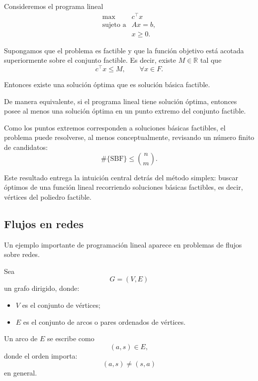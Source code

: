 \begin{theorem}
Consideremos el programa lineal
\[
    \begin{array}{ll}
        \max & c^\top x\\[1mm]
        \text{sujeto a} & Ax=b,\\
        & x\geq 0.
    \end{array}
\]

Supongamos que el problema es factible y que la función objetivo está acotada superiormente sobre el conjunto factible. Es decir, existe \(M\in\mathbb{R}\) tal que
\[
    c^\top x\leq M,
    \qquad
    \forall x\in F.
\]

Entonces existe una solución óptima que es solución básica factible.
\end{theorem}

De manera equivalente, si el programa lineal tiene solución óptima, entonces posee al menos una solución óptima en un punto extremo del conjunto factible.

Como los puntos extremos corresponden a soluciones básicas factibles, el problema puede resolverse, al menos conceptualmente, revisando un número finito de candidatos:
\[
    \#\{\text{SBF}\}
    \leq
    \binom{n}{m}.
\]

\begin{remark}
Este resultado entrega la intuición central detrás del método simplex: buscar óptimos de una función lineal recorriendo soluciones básicas factibles, es decir, vértices del poliedro factible.
\end{remark}

\subsection{Flujos en redes}

Un ejemplo importante de programación lineal aparece en problemas de flujos sobre redes.

Sea
\[
    G=(V,E)
\]
un grafo dirigido, donde:
\begin{itemize}
    \item \(V\) es el conjunto de vértices;
    \item \(E\) es el conjunto de arcos o pares ordenados de vértices.
\end{itemize}

Un arco de \(E\) se escribe como
\[
    (a,s)\in E,
\]
donde el orden importa:
\[
    (a,s)\neq (s,a)
\]
en general.

